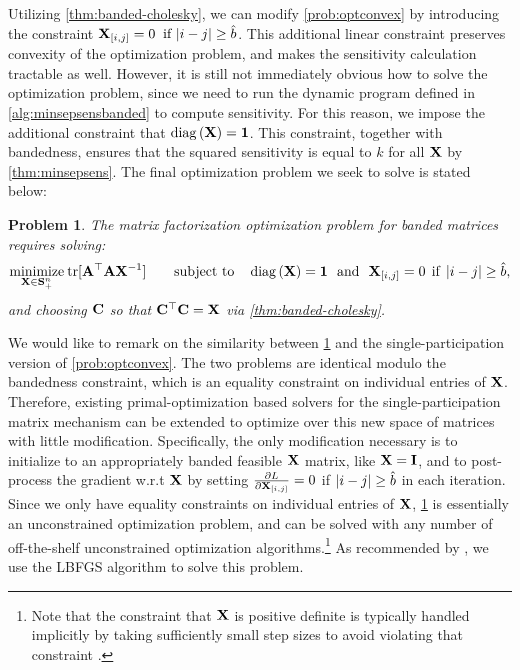 \documentclass{article}
\newtheorem{problem}{Problem}
\begin{document}
Utilizing \cref{thm:banded-cholesky}, we can modify \cref{prob:optconvex} by introducing the constraint $\mathbf{X}_{[i,j]} = 0 \: \text{ if } | i - j | \geq \hat{b}$.  This additional linear constraint preserves convexity of the optimization problem, and makes the sensitivity calculation tractable as well.  However, it is still not immediately obvious how to solve the optimization problem, since we need to run the dynamic program defined in \cref{alg:minsepsensbanded} to compute sensitivity.  For this reason, we impose the additional constraint that $ \operatorname{diag}{(\mathbf{X})} = \bf1$. This constraint, together with bandedness, ensures that the squared sensitivity is equal to $k$ for all $\mathbf{X}$ by \cref{thm:minsepsens}.  The final optimization problem we seek to solve is stated below:
%
%
\begin{problem}\label{prob:bandedopt}
The matrix factorization optimization problem for banded matrices requires solving: 
\begin{equation} \label{eq:bandedopt}
\underset{\mathbf{X} \in \mathbf{S}^{n}_{+}}{\text{minimize}} \:
\mathrm{tr}[\mathbf{A}^\top \mathbf{A} \mathbf{X}^{-1}] 
\qquad
\text{subject to}
\quad
\operatorname{diag}{(\mathbf{X})} = \mathbf{1} 
\text{\ \ and\ \ }
 \mathbf{X}_{[i,j]} = 0 \:\:\text{if}\:\: | i - j | \geq \hat{b}, 
\end{equation}
and choosing $\mathbf{C}$ so that $\mathbf{C}^\top \mathbf{C} = \mathbf{X}$ via \cref{thm:banded-cholesky}.
\end{problem}
%
We would like to remark on the similarity between \cref{prob:bandedopt} and the single-participation version of \cref{prob:optconvex}.  The two problems are identical modulo the bandedness constraint, which is an equality constraint on individual entries of $\mathbf{X}$.  Therefore, existing primal-optimization based solvers \cite{mckenna2021hdmm} for the single-participation matrix mechanism can be extended to optimize over this new space of matrices with little modification.  Specifically, the only modification necessary is to initialize to an appropriately banded feasible $\mathbf{X}$ matrix, like $\mathbf{X}=\mathbf{I}$, and to post-process the gradient w.r.t $\mathbf{X}$ by setting $\frac{\partial L}{\partial \mathbf{X}_{[i,j]}} = 0$ if $|i - j| \geq \hat{b}$ in each iteration.  Since we only have equality constraints on individual entries of $\mathbf{X}$, \cref{prob:bandedopt} is essentially an unconstrained optimization problem, and can be solved with any number of off-the-shelf unconstrained optimization algorithms.\footnote{Note that the constraint that $\mathbf{X}$ is positive definite is typically handled implicitly by taking sufficiently small step sizes to avoid violating that constraint \cite{yuan2016convex,mckenna2021hdmm}.}  As recommended by \citet{mckenna2021hdmm}, we use the LBFGS algorithm \cite{byrd1995limited} to solve this problem.  
\end{document}
